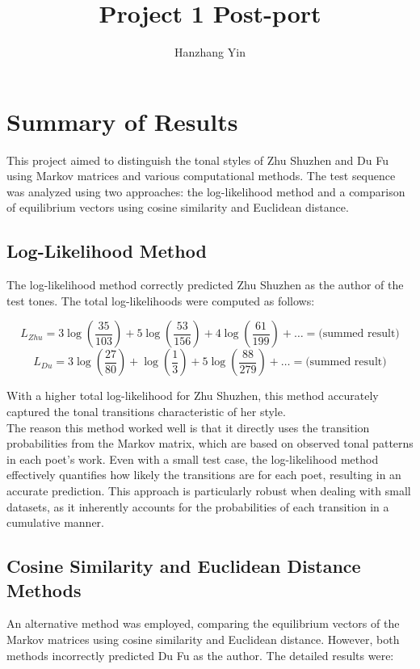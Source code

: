 \documentclass[12pt]{article}
\title{\vspace{-2cm}Project 1 Post-port}
\author{Hanzhang Yin}
\begin{document}
\maketitle

\section*{Summary of Results}

This project aimed to distinguish the tonal styles of Zhu Shuzhen and Du Fu using Markov matrices and various computational methods. The test sequence was analyzed using two approaches: the log-likelihood method and a comparison of equilibrium vectors using cosine similarity and Euclidean distance.

\subsection*{Log-Likelihood Method}

The log-likelihood method correctly predicted Zhu Shuzhen as the author of the test tones. The total log-likelihoods were computed as follows:

\[
L_{Zhu} = 3 \log\left( \frac{35}{103} \right) + 5 \log\left( \frac{53}{156} \right) + 4 \log\left( \frac{61}{199} \right) + \ldots = \text{(summed result)}
\]
\[
L_{Du} = 3 \log\left( \frac{27}{80} \right) + \log\left( \frac{1}{3} \right) + 5 \log\left( \frac{88}{279} \right) + \ldots = \text{(summed result)}
\]

\noindent With a higher total log-likelihood for Zhu Shuzhen, this method accurately captured the tonal transitions characteristic of her style. 
\\
The reason this method worked well is that it directly uses the transition probabilities from the Markov matrix, which are based on observed tonal patterns in each poet's work. Even with a small test case, the log-likelihood method effectively quantifies how likely the transitions are for each poet, resulting in an accurate prediction. This approach is particularly robust when dealing with small datasets, as it inherently accounts for the probabilities of each transition in a cumulative manner.


\subsection*{Cosine Similarity and Euclidean Distance Methods}

An alternative method was employed, comparing the equilibrium vectors of the Markov matrices using cosine similarity and Euclidean distance. However, both methods incorrectly predicted Du Fu as the author. The detailed results were:
\end{document}
